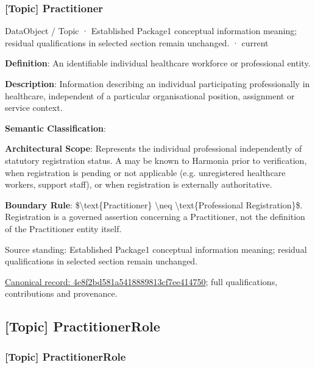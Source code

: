 \subsubsection{[Topic] Practitioner}

\label{element:4e8f2bd581a5418889813cf7ee414750}
{\small DataObject / Topic · Established Package1 conceptual information meaning; residual qualifications in selected section remain unchanged. · current}\par

\textbf{Definition}: An identifiable individual healthcare workforce or professional entity.



\textbf{Description}: Information describing an individual participating professionally in healthcare, independent of a particular organisational position, assignment or service context.



\textbf{Semantic Classification}: \texttt{}



\textbf{Architectural Scope}: Represents the individual professional independently of statutory registration status. A \texttt{} may be known to Harmonia prior to verification, when registration is pending or not applicable (e.g. unregistered healthcare workers, support staff), or when registration is externally authoritative.



\textbf{Boundary Rule}: \$\textbackslash{}text\{Practitioner\} \textbackslash{}neq \textbackslash{}text\{Professional Registration\}\$. Registration is a governed assertion concerning a Practitioner, not the definition of the Practitioner entity itself.



Source standing: Established Package1 conceptual information meaning; residual qualifications in selected section remain unchanged.


{\footnotesize \href{../../../../continuum/application/data-object/topic/4e8f2bd581a5418889813cf7ee414750.md}{Canonical record: 4e8f2bd581a5418889813cf7ee414750}; full qualifications, contributions and provenance.}\par
\subsection{[Topic] PractitionerRole}

\subsubsection{[Topic] PractitionerRole}


